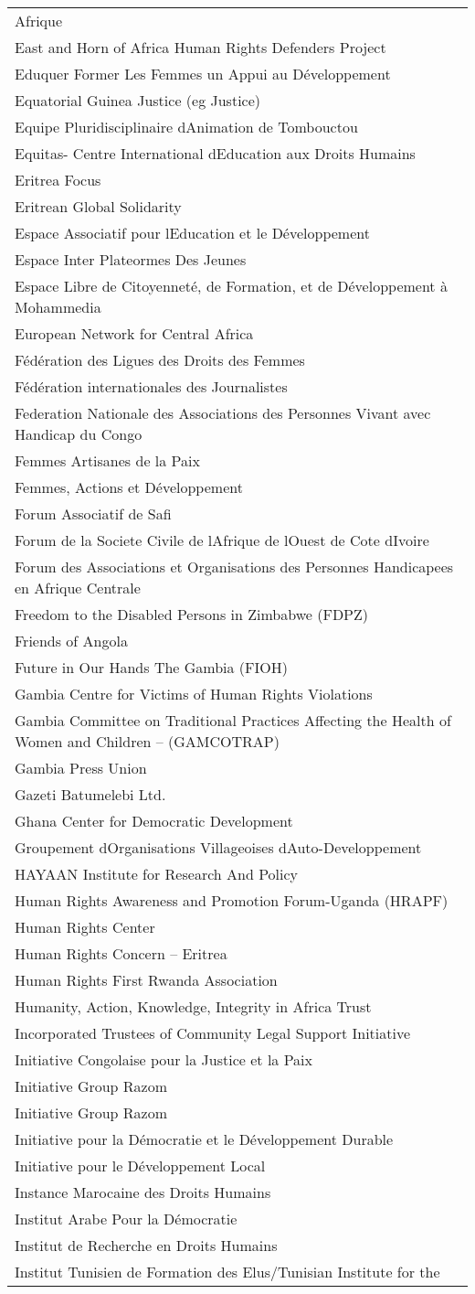 \begin{longtable}[]{@{}l@{}}
Afrique\tabularnewline
East and Horn of Africa Human Rights Defenders Project\tabularnewline
Eduquer Former Les Femmes un Appui au Développement\tabularnewline
Equatorial Guinea Justice (eg Justice)\tabularnewline
Equipe Pluridisciplinaire dAnimation de Tombouctou\tabularnewline
Equitas- Centre International dEducation aux Droits
Humains\tabularnewline
Eritrea Focus\tabularnewline
Eritrean Global Solidarity\tabularnewline
Espace Associatif pour lEducation et le Développement\tabularnewline
Espace Inter Plateormes Des Jeunes\tabularnewline
Espace Libre de Citoyenneté, de Formation, et de Développement à
Mohammedia\tabularnewline
European Network for Central Africa\tabularnewline
Fédération des Ligues des Droits des Femmes\tabularnewline
Fédération internationales des Journalistes\tabularnewline
Federation Nationale des Associations des Personnes Vivant avec Handicap
du Congo\tabularnewline
Femmes Artisanes de la Paix\tabularnewline
Femmes, Actions et Développement\tabularnewline
Forum Associatif de Safi\tabularnewline
Forum de la Societe Civile de lAfrique de lOuest de Cote
dIvoire\tabularnewline
Forum des Associations et Organisations des Personnes Handicapees en
Afrique Centrale\tabularnewline
Freedom to the Disabled Persons in Zimbabwe (FDPZ)\tabularnewline
Friends of Angola\tabularnewline
Future in Our Hands The Gambia (FIOH)\tabularnewline
Gambia Centre for Victims of Human Rights Violations\tabularnewline
Gambia Committee on Traditional Practices Affecting the Health of Women
and Children -- (GAMCOTRAP)\tabularnewline
Gambia Press Union\tabularnewline
Gazeti Batumelebi Ltd.\tabularnewline
Ghana Center for Democratic Development\tabularnewline
Groupement dOrganisations Villageoises
dAuto-Developpement\tabularnewline
HAYAAN Institute for Research And Policy\tabularnewline
Human Rights Awareness and Promotion Forum-Uganda (HRAPF)\tabularnewline
Human Rights Center\tabularnewline
Human Rights Concern -- Eritrea\tabularnewline
Human Rights First Rwanda Association\tabularnewline
Humanity, Action, Knowledge, Integrity in Africa Trust\tabularnewline
Incorporated Trustees of Community Legal Support
Initiative\tabularnewline
Initiative Congolaise pour la Justice et la Paix\tabularnewline
Initiative Group Razom\tabularnewline
Initiative Group Razom\tabularnewline
Initiative pour la Démocratie et le Développement Durable\tabularnewline
Initiative pour le Développement Local\tabularnewline
Instance Marocaine des Droits Humains\tabularnewline
Institut Arabe Pour la Démocratie\tabularnewline
Institut de Recherche en Droits Humains\tabularnewline
Institut Tunisien de Formation des Elus/Tunisian Institute for the

\end{longtable}
